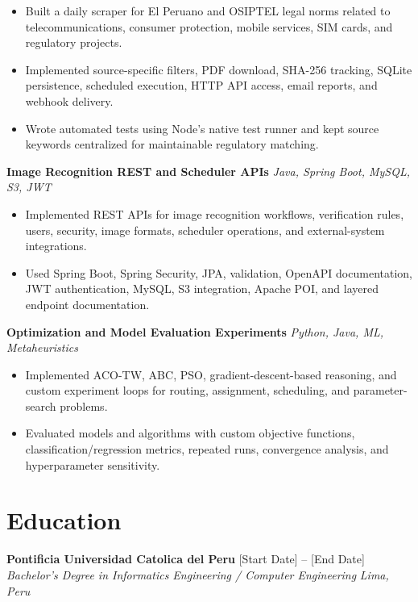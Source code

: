 \documentclass[10pt,letterpaper]{article}
\newcommand{\resumeSubheading}[4]{
  \textbf{#1} \hfill #2 \\
  \textit{#3} \hfill \textit{#4}
}
\newcommand{\resumeProjectHeading}[2]{
  \textbf{#1} \hfill \textit{#2}
}
\begin{document}
\begin{itemize}
    \item Built a daily scraper for El Peruano and OSIPTEL legal norms related to telecommunications, consumer protection, mobile services, SIM cards, and regulatory projects.
    \item Implemented source-specific filters, PDF download, SHA-256 tracking, SQLite persistence, scheduled execution, HTTP API access, email reports, and webhook delivery.
    \item Wrote automated tests using Node's native test runner and kept source keywords centralized for maintainable regulatory matching.
\end{itemize}

\resumeProjectHeading
{Image Recognition REST and Scheduler APIs}{Java, Spring Boot, MySQL, S3, JWT}

\begin{itemize}
    \item Implemented REST APIs for image recognition workflows, verification rules, users, security, image formats, scheduler operations, and external-system integrations.
    \item Used Spring Boot, Spring Security, JPA, validation, OpenAPI documentation, JWT authentication, MySQL, S3 integration, Apache POI, and layered endpoint documentation.
\end{itemize}

\resumeProjectHeading
{Optimization and Model Evaluation Experiments}{Python, Java, ML, Metaheuristics}

\begin{itemize}
    \item Implemented ACO-TW, ABC, PSO, gradient-descent-based reasoning, and custom experiment loops for routing, assignment, scheduling, and parameter-search problems.
    \item Evaluated models and algorithms with custom objective functions, classification/regression metrics, repeated runs, convergence analysis, and hyperparameter sensitivity.
\end{itemize}


\section{Education}

\resumeSubheading
{Pontificia Universidad Catolica del Peru}
{[Start Date] -- [End Date]}
{Bachelor's Degree in Informatics Engineering / Computer Engineering}
{Lima, Peru}
\end{document}
